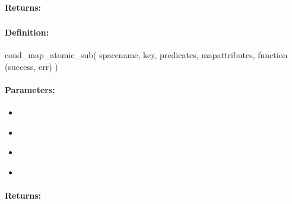 \paragraph{Returns:}


\pagebreak
\subsubsection{}
\label{api:nodejs:cond_map_atomic_sub}


\paragraph{Definition:}
\begin{javascriptcode}
cond_map_atomic_sub(
        spacename, key, predicates, mapattributes, function (success, err) {})
\end{javascriptcode}
\paragraph{Parameters:}
\begin{itemize}[noitemsep]
\item {}\\

\item {}\\

\item {}\\

\item {}\\

\end{itemize}

\paragraph{Returns:}


\pagebreak
\subsubsection{}
\label{api:nodejs:map_atomic_mul}


